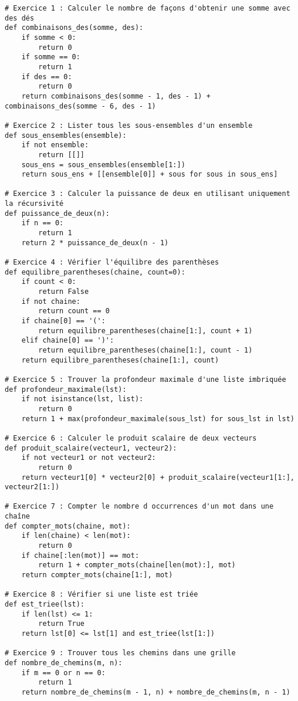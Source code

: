 \begin{lstlisting}
# Exercice 1 : Calculer le nombre de façons d'obtenir une somme avec des dés
def combinaisons_des(somme, des):
    if somme < 0:
        return 0
    if somme == 0:
        return 1
    if des == 0:
        return 0
    return combinaisons_des(somme - 1, des - 1) + combinaisons_des(somme - 6, des - 1)

# Exercice 2 : Lister tous les sous-ensembles d'un ensemble
def sous_ensembles(ensemble):
    if not ensemble:
        return [[]]
    sous_ens = sous_ensembles(ensemble[1:])
    return sous_ens + [[ensemble[0]] + sous for sous in sous_ens]

# Exercice 3 : Calculer la puissance de deux en utilisant uniquement la récursivité
def puissance_de_deux(n):
    if n == 0:
        return 1
    return 2 * puissance_de_deux(n - 1)

# Exercice 4 : Vérifier l'équilibre des parenthèses
def equilibre_parentheses(chaine, count=0):
    if count < 0:
        return False
    if not chaine:
        return count == 0
    if chaine[0] == '(':
        return equilibre_parentheses(chaine[1:], count + 1)
    elif chaine[0] == ')':
        return equilibre_parentheses(chaine[1:], count - 1)
    return equilibre_parentheses(chaine[1:], count)

# Exercice 5 : Trouver la profondeur maximale d'une liste imbriquée
def profondeur_maximale(lst):
    if not isinstance(lst, list):
        return 0
    return 1 + max(profondeur_maximale(sous_lst) for sous_lst in lst)

# Exercice 6 : Calculer le produit scalaire de deux vecteurs
def produit_scalaire(vecteur1, vecteur2):
    if not vecteur1 or not vecteur2:
        return 0
    return vecteur1[0] * vecteur2[0] + produit_scalaire(vecteur1[1:], vecteur2[1:])

# Exercice 7 : Compter le nombre d occurrences d'un mot dans une chaîne
def compter_mots(chaine, mot):
    if len(chaine) < len(mot):
        return 0
    if chaine[:len(mot)] == mot:
        return 1 + compter_mots(chaine[len(mot):], mot)
    return compter_mots(chaine[1:], mot)

# Exercice 8 : Vérifier si une liste est triée
def est_triee(lst):
    if len(lst) <= 1:
        return True
    return lst[0] <= lst[1] and est_triee(lst[1:])

# Exercice 9 : Trouver tous les chemins dans une grille
def nombre_de_chemins(m, n):
    if m == 0 or n == 0:
        return 1
    return nombre_de_chemins(m - 1, n) + nombre_de_chemins(m, n - 1)


\end{lstlisting}
